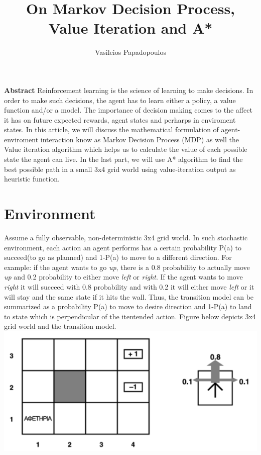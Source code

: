 \documentclass[10pt,a4paper,twocolumn]{article}
\title{On Markov Decision Process, Value Iteration and A*}
\author{Vasileios Papadopoulos}
\begin{document}
	\maketitle
	
	\textbf{Abstract}
	Reinforcement learning is the science of learning to make decisions. In order to make such decisions, the agent has to learn either a policy,	a value function and/or a model. The importance of decision making comes to the affect it has on future expected rewards, agent states and perharps in enviroment states. In this article, we will discuss the mathematical formulation of agent-enviroment interaction know as Markov Decision Process (MDP) as well the Value iteration algorithm which helps us to calculate the value of each possible state the agent can live. In the last part, we will use A* algorithm to find the best possible path in a small 3x4 grid world using value-iteration output as heuristic function.
	
	
	\section{Environment}
	
	Assume a fully observable, non-deterministic 3x4 grid world. In such stochastic environment, 
	each action an agent performs has a certain probability P(a) to succeed(to go as planned) and 1-P(a) to move to a different direction. 
	For example: if the agent wants to go \textit{up}, there is a 0.8 probability to actually move \textit{up} and 0.2 probability to either move \textit{left} or \textit{right}. If the agent wants to move \textit{right} it will succeed with 0.8 probability and with 0.2 it will either move \textit{left} or it will stay and the same state if it hits the wall. Thus, the transition model can be summarized as a probability P(a) to move to desire direction and 1-P(a) to land to state which is perpendicular of the itentended action. Figure below depicts 3x4 grid world and the transition model.
	\includegraphics{grid_world}
\end{document}
